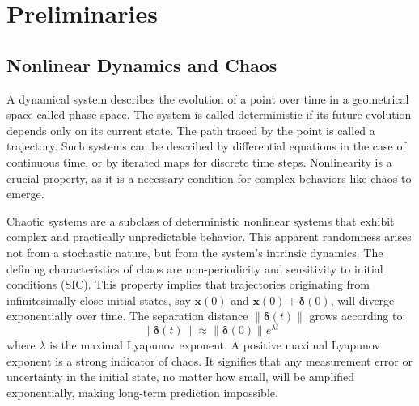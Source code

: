 \documentclass[a4paper,12pt]{article}
\begin{document}
\section{Preliminaries}
\label{sec:preliminaries}


\subsection{Nonlinear Dynamics and Chaos}
\label{subsec:nonlinear_dynamics}

A dynamical system describes the evolution of a point over time in a geometrical space called phase space. The system is called deterministic if its future evolution depends only on its current state. The path traced by the point is called a trajectory. %
Such systems can be described by differential equations in the case of continuous time, or by iterated maps for discrete time steps. Nonlinearity is a crucial property, as it is a necessary condition for complex behaviors like chaos to emerge. %

Chaotic systems are a subclass of deterministic nonlinear systems that exhibit complex and practically unpredictable behavior. This apparent randomness arises not from a stochastic nature, but from the system's intrinsic dynamics. The defining characteristics of chaos are non-periodicity and sensitivity to initial conditions (SIC). This property implies that trajectories originating from infinitesimally close initial states, say $\mathbf{x}(0)$ and $\mathbf{x}(0) + \bm{\delta}(0)$, will diverge exponentially over time. The separation distance $\|\bm{\delta}(t)\|$ grows according to:
\begin{equation}
    \|\bm{\delta}(t)\| \approx \|\bm{\delta}(0)\| e^{\lambda t}
\end{equation}
where $\lambda$ is the maximal Lyapunov exponent. A positive maximal Lyapunov exponent is a strong indicator of chaos. It signifies that any measurement error or uncertainty in the initial state, no matter how small, will be amplified exponentially, making long-term prediction impossible.
\end{document}
